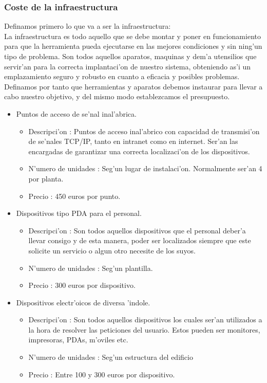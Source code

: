 \subsubsection{Coste de la infraestructura}
Definamos primero lo que va a ser la infraestructura:\\ La infraestructura es todo aquello que se debe montar y poner en funcionamiento
para que la herramienta pueda ejecutarse en las mejores condiciones y sin ning'un tipo de problema. Son todos aquellos aparatos, maquinas
y dem'a utensilios que servir'an para la correcta implantaci'on de nuestro sistema, obteniendo as'i un emplazamiento seguro y 
robusto en cuanto a eficacia y posibles problemas.\\ Definamos por tanto que herramientas y aparatos debemos instaurar para llevar
a cabo nuestro objetivo, y del mismo modo establezcamos el presupuesto.\\

\begin{itemize}
\item	Puntos de acceso de se'nal inal'abrica.
	\begin{itemize}
	\item Descripci'on : Puntos de acceso inal'abrico con capacidad de transmisi'on de se'nales TCP/IP, tanto en intranet como en internet.
				  Ser'an las encargadas de garantizar una correcta localizaci'on de los dispositivos.
	\item N'umero de unidades : Seg'un lugar de instalaci'on. Normalmente ser'an 4 por planta.
	\item Precio : 450 euros por punto.
	\end{itemize}
\item	Dispositivos tipo PDA para el personal.
	\begin{itemize}
	\item Descripci'on : Son todos aquellos dispositivos que el personal deber'a llevar consigo y de esta manera, poder ser localizados
				  siempre que este solicite un servicio o algun otro necesite de los suyos. 
	\item N'umero de unidades : Seg'un plantilla.
	\item Precio : 300 euros por dispositivo.
	\end{itemize}

\item	Dispositivos electr'oicos de diversa 'indole. 
	\begin{itemize}
	\item Descripci'on : Son todos aquellos dispositivos los cuales ser'an utilizados a la hora de resolver las peticiones del usuario.
	Estos pueden ser monitores, impresoras, PDAs, m'oviles etc.
	\item N'umero de unidades : Seg'un estructura del edificio
	\item Precio : Entre 100 y 300 euros por dispositivo.
	\end{itemize}

\end{itemize}

